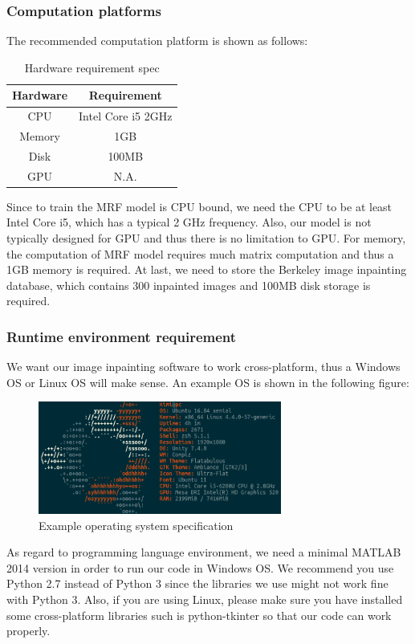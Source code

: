 \subsubsection{Computation platforms}
The recommended computation platform is shown as follows:
\begin{table}[H]
\centering
\begin{tabular}{|c|c|}
\hline
Hardware & Requirement \\ \hline
CPU & Intel Core i5 2GHz \\ \hline
Memory & 1GB \\ \hline
Disk & 100MB \\ \hline
GPU & N.A. \\ \hline
\end{tabular}
\caption{Hardware requirement spec}
\end{table}
Since to train the MRF model is CPU bound, we need the CPU to be at least Intel Core i5, which has a typical 2 GHz frequency. Also, our model is not typically designed for GPU and thus there is no limitation to GPU. For memory, the computation of MRF model requires much matrix computation and thus a 1GB memory is required. At last, we need to store the Berkeley image inpainting database, which contains 300 inpainted images and 100MB disk storage is required.
\subsubsection{Runtime environment requirement}
We want our image inpainting software to work cross-platform, thus a Windows OS or Linux OS will make sense. An example OS is shown in the following figure:
\begin{figure}[H]
\centering
\includegraphics[width=8cm]{ubuntu.png}
\caption{Example operating system specification}
\end{figure}

As regard to programming language environment, we need a minimal MATLAB 2014 version in order to run our code in Windows OS. We recommend you use Python 2.7 instead of Python 3 since the libraries we use might not work fine with Python 3. Also, if you are using Linux, please make sure you have installed some cross-platform libraries such is python-tkinter so that our code can work
properly.

